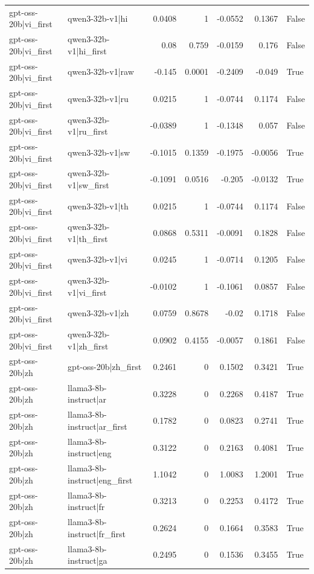 \begin{table}
\begin{tabular}{l l r r r r l}
gpt-oss-20b|vi_first & qwen3-32b-v1|hi & 0.0408 & 1 & -0.0552 & 0.1367 & False \\
gpt-oss-20b|vi_first & qwen3-32b-v1|hi_first & 0.08 & 0.759 & -0.0159 & 0.176 & False \\
gpt-oss-20b|vi_first & qwen3-32b-v1|raw & -0.145 & 0.0001 & -0.2409 & -0.049 & True \\
gpt-oss-20b|vi_first & qwen3-32b-v1|ru & 0.0215 & 1 & -0.0744 & 0.1174 & False \\
gpt-oss-20b|vi_first & qwen3-32b-v1|ru_first & -0.0389 & 1 & -0.1348 & 0.057 & False \\
gpt-oss-20b|vi_first & qwen3-32b-v1|sw & -0.1015 & 0.1359 & -0.1975 & -0.0056 & True \\
gpt-oss-20b|vi_first & qwen3-32b-v1|sw_first & -0.1091 & 0.0516 & -0.205 & -0.0132 & True \\
gpt-oss-20b|vi_first & qwen3-32b-v1|th & 0.0215 & 1 & -0.0744 & 0.1174 & False \\
gpt-oss-20b|vi_first & qwen3-32b-v1|th_first & 0.0868 & 0.5311 & -0.0091 & 0.1828 & False \\
gpt-oss-20b|vi_first & qwen3-32b-v1|vi & 0.0245 & 1 & -0.0714 & 0.1205 & False \\
gpt-oss-20b|vi_first & qwen3-32b-v1|vi_first & -0.0102 & 1 & -0.1061 & 0.0857 & False \\
gpt-oss-20b|vi_first & qwen3-32b-v1|zh & 0.0759 & 0.8678 & -0.02 & 0.1718 & False \\
gpt-oss-20b|vi_first & qwen3-32b-v1|zh_first & 0.0902 & 0.4155 & -0.0057 & 0.1861 & False \\
gpt-oss-20b|zh & gpt-oss-20b|zh_first & 0.2461 & 0 & 0.1502 & 0.3421 & True \\
gpt-oss-20b|zh & llama3-8b-instruct|ar & 0.3228 & 0 & 0.2268 & 0.4187 & True \\
gpt-oss-20b|zh & llama3-8b-instruct|ar_first & 0.1782 & 0 & 0.0823 & 0.2741 & True \\
gpt-oss-20b|zh & llama3-8b-instruct|eng & 0.3122 & 0 & 0.2163 & 0.4081 & True \\
gpt-oss-20b|zh & llama3-8b-instruct|eng_first & 1.1042 & 0 & 1.0083 & 1.2001 & True \\
gpt-oss-20b|zh & llama3-8b-instruct|fr & 0.3213 & 0 & 0.2253 & 0.4172 & True \\
gpt-oss-20b|zh & llama3-8b-instruct|fr_first & 0.2624 & 0 & 0.1664 & 0.3583 & True \\
gpt-oss-20b|zh & llama3-8b-instruct|ga & 0.2495 & 0 & 0.1536 & 0.3455 & True \\

\end{tabular}
\end{table}
